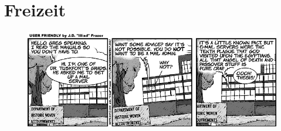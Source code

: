 \section{Freizeit}
\begin{figure}[b]
	\centering\includegraphics[width=\textwidth]{bilder/comics/uf008003.png}
\end{figure}

\newpage
